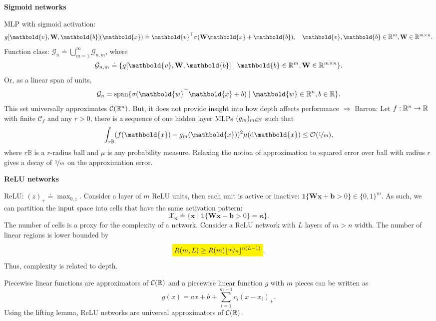 \documentclass[10pt]{article}
\newenvironment{topic}[1]
{\textbf{\sffamily \footnotesize \colorbox{black}{\rlap{\textbf{\textcolor{white}{#1}}}\hspace{\linewidth}\hspace{-2\fboxsep}}}}
{}
\newenvironment{subtopic}[1]
{\begin{center}\textbf{\footnotesize \sffamily #1}\end{center}}
{}
\renewcommand{\mat}[1]{\ensuremath{\mathbf{#1}}}
\renewcommand{\vec}[1]{\ensuremath{\mathbold{#1}}}
\begin{document}
\begin{multicols*}{3}
\begin{topic}{Feedforward networks}
        \begin{subtopic}{Sigmoid networks}
            MLP with sigmoid activation: \[
                g[\vec{v}, \mat{W}, \vec{b}](\vec{x}) \doteq \transpose{\vec{v}} \sigma(\mat{W}\vec{x}+\vec{b}), \quad \vec{v},\vec{b}\in\R^m, \mat{W}\in\R^{m\times n}.
            \]
            Function class: $\mathcal{G}_n \doteq \bigcup_{m=1}^{\infty} \mathcal{G}_{n,m}$, where \[
                \mathcal{G}_{n,m} \doteq \{ g[\vec{v},\mat{W},\vec{b}] \mid \vec{b}\in\R^m, \mat{W}\in\R^{m\times n} \}.
            \]
            Or, as a linear span of units, \[
                \mathcal{G}_{n} = \mathrm{span} \{ \sigma(\transpose{\vec{w}}\vec{x} + b) \mid \vec{w} \in \R^n, b \in \R \}.
            \]
            This set universally approximates $\mathcal{C}(\mathbb{R}^n)$. But, it does not provide insight into how
            depth affects performance $\Rightarrow$ Barron: Let $f: \mathbb{R}^n \to \mathbb{R}$ with finite $\mathcal{C}_f$ and any $r
                > 0$, there is a sequence of one hidden layer MLPs $(g_m)_{m \in \mathbb{N}}$ such that \[
                \int_{r \mathbb{B}} (f(\vec{x}) - g_m(\vec{x}))^2 \mu(\mathrm{d}\vec{x}) \leq \bigo{\nicefrac{1}{m}},
            \]
            where $r\mathbb{B}$ is a $r$-radius ball and $\mu$ is any probability measure. Relaxing the notion
            of approximation to squared error over ball with radius $r$ gives a decay of $\nicefrac{1}{m}$ on
            the approximation error.
        \end{subtopic}

        \begin{subtopic}{ReLU networks}
            ReLU: $(z)_+ \doteq \max_{0,z}$. Consider a layer of $m$ ReLU units, then each unit is
            active or inactive: $\mathbb{1}\{ \mat{W}\vec{x} + \vec{b} > 0 \} \in \{ 0,1 \}^m$. As
            such, we can partition the input space into cells that have the same activation pattern: \[
                \mathcal{X}_{\vec{\kappa}} \doteq \{ \vec{x} \mid \mathbb{1}\{ \mat{W}\vec{x} + \vec{b} > 0 \} = \vec{\kappa} \}.
            \]
            The number of cells is a proxy for the complexity of a network. Consider a ReLU network with $L$
            layers of $m > n$ width. The number of linear regions is lower bounded by \[
                \colorbox{yellow}{$\displaystyle R(m,L) \geq R(m) \lfloor \nicefrac{m}{n} \rfloor^{n(L-1)}$}.
            \]
            Thus, complexity is related to depth.

            Piecewise linear functions are approximators of $\mathcal{C}(\mathbb{R})$ and a piecewise linear function
            $g$ with $m$ pieces can be written as \[
                g(x) = ax + b + \sum_{i=1}^{m-1} c_i(x - x_i)_+.
            \]
            Using the lifting lemma, ReLU networks are universal approximators of $\mathcal{C}(\mathbb{R})$.
        \end{subtopic}


\end{topic}
\end{multicols*}
\end{document}
